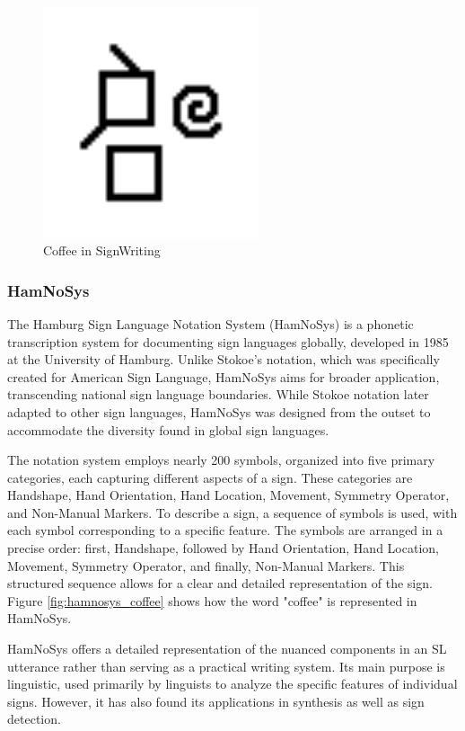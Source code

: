 \documentclass[../../main.tex]{subfiles}
\begin{document}
\begin{figure}
  \centering \includegraphics[width = 2.5in]{chapters/background_work/images/signwriting_coffee.png}
  \caption{Coffee in SignWriting}
  \label{fig:signwriting_coffee}
\end{figure}

\subsubsection{HamNoSys}
\label{subsubsec:hamnosys}

The Hamburg Sign Language Notation System (HamNoSys) is a phonetic transcription system for documenting sign languages globally, developed in 1985 at the University of Hamburg. Unlike Stokoe's notation, which was specifically created for American Sign Language, HamNoSys aims for broader application, transcending national sign language boundaries. While Stokoe notation later adapted to other sign languages, HamNoSys was designed from the outset to accommodate the diversity found in global sign languages.

The notation system employs nearly 200 symbols, organized into five primary categories, each capturing different aspects of a sign. These categories are Handshape, Hand Orientation, Hand Location, Movement, Symmetry Operator, and Non-Manual Markers. To describe a sign, a sequence of symbols is used, with each symbol corresponding to a specific feature. The symbols are arranged in a precise order: first, Handshape, followed by Hand Orientation, Hand Location, Movement, Symmetry Operator, and finally, Non-Manual Markers. This structured sequence allows for a clear and detailed representation of the sign. Figure \ref{fig:hamnosys_coffee} shows how the word "coffee" is represented in HamNoSys.

HamNoSys offers a detailed representation of the nuanced components in an SL utterance rather than serving as a practical writing system. Its main purpose is linguistic, used primarily by linguists to analyze the specific features of individual signs. However, it has also found its applications in synthesis\cite{elliott2010towards} as well as sign detection\cite{mocialov2022unsupervised}.
\end{document}
